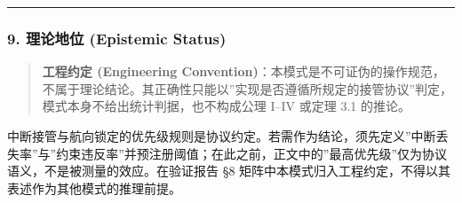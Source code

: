 \begin{Shaded}
\begin{Highlighting}[]
  \OperatorTok{:} \NormalTok{)}\OperatorTok{:} \NormalTok{ \{}
    \NormalTok{ (} \OperatorTok{===} \NormalTok{) }\OperatorTok{;}

    \OperatorTok{=} 
      \KeywordTok{=\textgreater{}} \SpecialCharTok{$\{}\SpecialCharTok{\}}\NormalTok{)}
      \NormalTok{(}\NormalTok{)}\OperatorTok{;}

     \VerbatimStringTok{\textasciigrave{}}\SpecialCharTok{$\{}\VerbatimStringTok{\textasciigrave{}}\OperatorTok{;}
\NormalTok{  \}}
\NormalTok{\}}
\end{Highlighting}
\end{Shaded}

\begin{center}\rule{0.5\linewidth}{0.5pt}\end{center}

\subsubsection{9. 理论地位 (Epistemic
Status)}\label{ux7406ux8bbaux5730ux4f4d-epistemic-status-2}

\begin{quote}
\textbf{工程约定 (Engineering
Convention)}：本模式是不可证伪的操作规范，不属于理论结论。其正确性只能以''实现是否遵循所规定的接管协议''判定，模式本身不给出统计判据，也不构成公理
I--IV 或定理 3.1 的推论。
\end{quote}

中断接管与航向锁定的优先级规则是协议约定。若需作为结论，须先定义''中断丢失率''与''约束违反率''并预注册阈值；在此之前，正文中的''最高优先级''仅为协议语义，不是被测量的效应。在验证报告
§8 矩阵中本模式归入工程约定，不得以其表述作为其他模式的推理前提。

